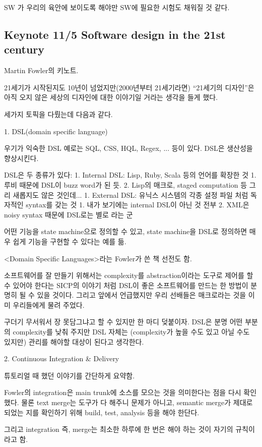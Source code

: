 \documentclass[a4paper]{article}
\begin{document}
SW 가 우리의 육안에 보이도록 해야만 SW에 필요한 시험도 채워질 것 같다.
 
\subsection{Keynote 11/5 Software design in the 21st century}
 
Martin Fowler의 키노트.
 
21세기가 시작된지도 10년이 넘었지만(2000년부터 21세기라면) “21세기의
디자인”은 아직 오지 않은 세상의 디자인에 대한 이야기일 거라는 생각을
들게 했다.
 
세가지 토픽을 다뤘는데 다음과 같다.
 
1. DSL(domain specific language)
 
우기가 익숙한 DSL 예로는 SQL, CSS, HQL, Regex, ... 등이 있다. DSL은 생산성을 향상시킨다.
 
DSL은 두 종류가 있다:
1. Internal DSL: Lisp, Ruby, Scala  등의 언어를 확장한 것
1. 루비 때문에 DSL이 buzz word가 된 듯.
2. Lisp의 매크로, staged computation 등 그리 새롭지도 않은 것인데...
1. External DSL: 유닉스 시스템의 각종 설정 파일 처럼 독자적인  syntax를 갖는 것
1. 내가 보기에는 internal DSL이 아닌 것 전부
2. XML은 noisy syntax 때문에 DSL로는 별로 라는 군
 
어떤 기능을 state machine으로 정의할 수 있고, state machine을 DSL로
정의하면 매우 쉽게 기능을 구현할 수 있다는 예를 듦.
 
<Domain Specific Languages>라는 Fowler가 쓴 책 선전도 함.
 
소프트웨어를 잘 만들기 위해서는 complexity를 abstraction이라는 도구로
제어를 할 수 있어야 한다는 SICP의 이야기 처럼 DSL이 좋은 소프트웨어를
만드는 한 방법이 분명히 될 수 있을 것이다. 그리고 앞에서 언급했지만
우리 선배들은 매크로라는 것을 이미 우리들에게 물려 주었다.
 
구더기 무서워서 장 못담그냐고 할 수 있지만 한 마디 덪붙이자. DSL은 분명
어떤 부분의 complexity를 낮춰 주지만 DSL 자체는 (complexity가 높을 수도
있고 아닐 수도 있지만) 관리를 해야할 대상이 된다고 생각한다.
 
2. Continuous Integration \& Delivery
 
튜토리얼 때 했던 이야기를 간단하게 요약함. 
 
Fowler의 integration은 main trunk에 소스를 모으는 것을 의미한다는 점을
다시 확인했다.  물론 text merge는 도구가 다 해주니 문제가 아니고,
semantic merge가 제대로 되었는 지를 확인하기 위해 build, test,
analysis 등을 해야 한단다.
 
그리고 integration 즉, merge는 최소한 하루에 한 번은 해야 하는 것이
자기의 규칙이라고 함.
 
\end{document}
